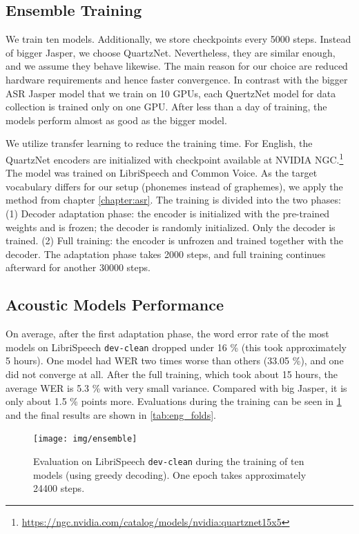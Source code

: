 \subsection{Ensemble Training}
We train ten models. Additionally, we store checkpoints every 5000 steps. Instead of bigger Jasper, we choose QuartzNet. Nevertheless, they are similar enough, and we assume they behave likewise. The main reason for our choice are reduced hardware requirements and hence faster convergence. In contrast with the bigger ASR Jasper model that we train on 10 GPUs, each QuertzNet model for data collection is trained only on one GPU. After less than a day of training, the models perform almost as good as the bigger model.

We utilize transfer learning to reduce the training time. For English, the QuartzNet encoders are initialized with checkpoint available at NVIDIA NGC.\footnote{\url{https://ngc.nvidia.com/catalog/models/nvidia:quartznet15x5}} The model was trained on LibriSpeech and Common Voice. As the target vocabulary differs for our setup (phonemes instead of graphemes), we apply the method from chapter \ref{chapter:asr}. The training is divided into the two phases: (1) Decoder adaptation phase: the encoder is initialized with the pre-trained weights and is frozen; the decoder is randomly initialized. Only the decoder is trained. (2) Full training: the encoder is unfrozen and trained together with the decoder. The adaptation phase takes 2000 steps, and full training continues afterward for another 30000 steps.

\subsection{Acoustic Models Performance}
On average, after the first adaptation phase, the word error rate of the most models on LibriSpeech \texttt{dev-clean} dropped under 16 \% (this took approximately 5 hours). One model had WER two times worse than others (33.05 \%), and one did not converge at all. After the full training, which took about 15 hours, the average WER is 5.3 \% with very small variance. Compared with big Jasper, it is only about 1.5 \% points more. Evaluations during the training can be seen in \cref{fig:ensemble_training} and the final results are shown in \cref{tab:eng_folds}.

\begin{figure}[t]
	\texttt{[image: img/ensemble]}
	\caption[English ensemble training]{Evaluation on LibriSpeech \texttt{dev-clean} during the training of ten models (using greedy decoding). One epoch takes approximately 24400 steps.}
	\label{fig:ensemble_training}
\end{figure}

